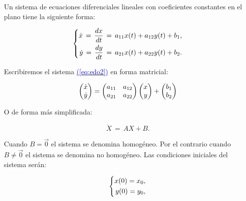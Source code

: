 \documentclass[12pt,a4paper]{report} %
\newcommand{\eref}[1]{\hyperref[#1]{\textcolor{blue}{(\ref*{#1})}}}
\begin{document}
	\vspace{0.5cm} Un sistema de ecuaciones diferenciales lineales con coeficientes constantes en el plano tiene la siguiente forma:
	
	\begin{equation}
		\label{eq:edo2}
		\scalebox{1}{$\displaystyle
			\left\{
			\begin{aligned}
				\dot{x}\,=\,\frac{dx}{dt}\,=\,a_{11}x(t)+a_{12}y(t)+b_1, \\
				\dot{y}\,=\,\frac{dy}{dt}\,=\,a_{21}x(t)+a_{22}y(t)+b_2.
			\end{aligned}
			\right.
			$}
	\end{equation}\smallskip
	
	\noindent Escribiremos el sistema \eref{eq:edo2} en forma matricial:
	
	\begin{equation}
		\label{eq:matrxedo2}
		\scalebox{1}{$\displaystyle
		\begin{pmatrix}
			\dot{x}\\
			\dot{y}\\
		\end{pmatrix} =
		\begin{pmatrix}
			a_{11} & a_{12}\\
		    a_{21} & a_{22}\\
		\end{pmatrix} 
		\begin{pmatrix}
			x\\
			y\\
		\end{pmatrix} + 
		\begin{pmatrix}
			b_1\\
			b_2\\
		\end{pmatrix}
		$}
	\end{equation} \smallskip
	
	\noindent O de forma más simplificada:
	
	\begin{equation}
		\label{eq:sisautonomo}
		\dot{X}\,=\,AX+B.
	\end{equation}\smallskip
	
	\noindent Cuando $B=\vec{0}$ el sistema se denomina homogéneo. Por el contrario cuando $B\neq\vec{0}$ el sistema se denomina no homogéneo. Las condiciones iniciales del sistema serán:
	
	\begin{equation}
		\label{eq:ci}
		\scalebox{1}{$\displaystyle
			\left\{
			\begin{aligned}
				x(0)=x_0, \\
			    y(0)=y_0,
			\end{aligned}
			\right.
			$}
	\end{equation}\smallskip
	
\end{document}
